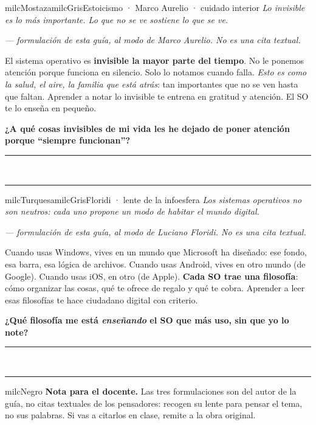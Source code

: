 \documentclass[11pt,letterpaper]{article}
\newcommand{\linead}[1]{\noindent\color{milcLinea}\rule{#1}{0.5pt}\color{milcNegro}}
\begin{document}
\begin{softbox}{milcMostaza}{milcGris}{Estoicismo · Marco Aurelio · cuidado interior}
\textit{Lo invisible es lo más importante. Lo que no se ve sostiene lo que se ve.}

{\footnotesize\itshape\color{milcNegro!70}--- formulación de esta guía, al modo de Marco Aurelio. No es una cita textual.}

El sistema operativo es \textbf{invisible la mayor parte del tiempo}. No le ponemos atención porque funciona en silencio. Solo lo notamos cuando falla. \emph{Esto es como la salud, el aire, la familia que está atrás}: tan importantes que no se ven hasta que faltan. Aprender a notar lo invisible te entrena en gratitud y atención. El SO te lo enseña en pequeño.

\textbf{¿A qué cosas invisibles de mi vida les he dejado de poner atención porque ``siempre funcionan''?}
\end{softbox}
\linead{\linewidth}\\[1mm]
\linead{\linewidth}

\begin{softbox}{milcTurquesa}{milcGris}{Floridi · lente de la infoesfera}
\textit{Los sistemas operativos no son neutros: cada uno propone un modo de habitar el mundo digital.}

{\footnotesize\itshape\color{milcNegro!70}--- formulación de esta guía, al modo de Luciano Floridi. No es una cita textual.}

Cuando usas Windows, vives en un mundo que Microsoft ha diseñado: ese fondo, esa barra, esa lógica de archivos. Cuando usas Android, vives en otro mundo (de Google). Cuando usas iOS, en otro (de Apple). \textbf{Cada SO trae una filosofía}: cómo organizar las cosas, qué te ofrece de regalo y qué te cobra. Aprender a leer esas filosofías te hace ciudadano digital con criterio.

\textbf{¿Qué filosofía me está \emph{enseñando} el SO que más uso, sin que yo lo note?}
\end{softbox}
\linead{\linewidth}\\[1mm]
\linead{\linewidth}

\begin{infoband}{milcNegro}
\textbf{Nota para el docente.} Las tres formulaciones son del autor de la guía, no citas textuales de los pensadores: recogen su lente para pensar el tema, no sus palabras. Si vas a citarlos en clase, remite a la obra original.
\end{infoband}
\end{document}
